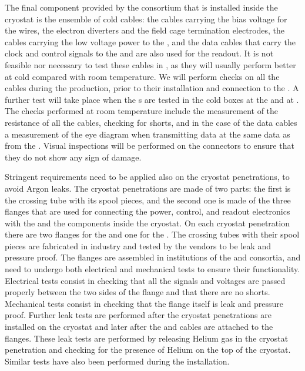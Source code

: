 The final component provided by the  consortium
that is installed inside the cryostat is the ensemble of cold
cables: the cables carrying the bias voltage for the 
wires, the electron diverters and the field cage termination electrodes,
the cables carrying the low voltage power to the ,
and the data cables that carry the clock and control signals
to the  and are also used for the readout. It is not
feasible nor necessary to test these cables in \lntwo,
as they will usually perform better at cold compared with
room temperature. We will perform checks on all the cables 
during the production, prior to their installation and 
connection to the . A further test will take place
when the s are tested in the cold boxes at the 
and at \surf. The checks performed at room temperature include
the measurement of the resistance of all the cables, checking for
shorts, and in the case of the data cables a measurement of the
eye diagram when transmitting data at the same data as from the
. Visual inspections will be performed on the connectors
to ensure that they do not show any sign of damage.

Stringent requirements need to be applied also on the cryostat
penetrations, to avoid Argon leaks. The cryostat penetrations are
made of two parts: the first is the crossing tube with its spool pieces,
and the second one is made of the three flanges that are used for
connecting the power, control, and readout electronics with the
 and the  components inside the
cryostat. On each cryostat penetration there are two flanges for
the  and one for the . The crossing
tubes with their spool pieces are fabricated in industry and tested
by the vendors to be leak and pressure proof. The flanges are assembled
in institutions of the  and  consortia,
and need to undergo both electrical and mechanical tests to ensure their
functionality. Electrical tests consist in checking that all the
signals and voltages are passed properly between the two sides of the
flange and that there are no shorts. Mechanical tests consist in 
checking that the flange itself is leak and pressure proof. Further
leak tests are performed after the cryostat penetrations are installed
on the cryostat and later after the  and 
cables are attached to the flanges. These leak tests are
performed by releasing Helium gas in the cryostat penetration and
checking for the presence of Helium on the top of the cryostat. Similar
tests have also been performed during the  installation.

